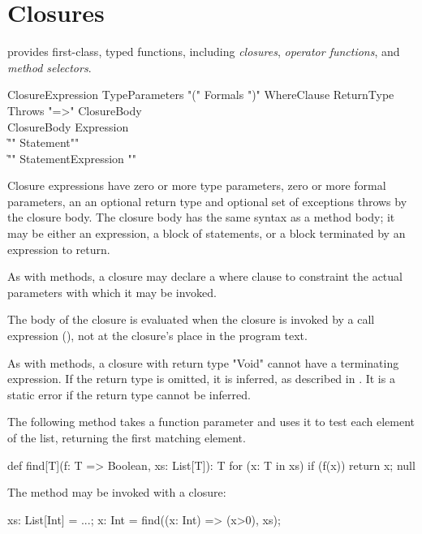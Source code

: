 \section{Closures}
\label{Closures}

\Xten{} provides first-class, typed functions, including
\emph{closures},
\emph{operator functions},
and \emph{method selectors}.

\begin{grammar}
ClosureExpression \:
        TypeParameters\opt
        \xcd"("
        Formals\opt
        \xcd")"
        WhereClause\opt
        ReturnType\opt
        Throws\opt
        \xcd"=>" ClosureBody \\
ClosureBody \:
        Expression \\
        \| \xcd"{" Statement\star \xcd"}" \\
        \| \xcd"{" Statement\star Expression \xcd"}" \\
\end{grammar}

Closure expressions have zero or more type parameters,
zero or more formal parameters, an an optional return type and
optional set of exceptions throws by the closure body.  The
closure body has the same syntax as a method body; it may be
either an expression, a block of statements, or a block
terminated by an expression to return.

\label{ClosureWhereClause}

As with methods, a closure may declare a where clause to
constraint the actual parameters with which it may be invoked.

The body of the closure is evaluated when the closure is
invoked by a call expression (), not at the closure's
place in the program text.

As with methods, a closure with return type \xcd"Void" cannot
have a terminating expression. 
If the return type is omitted, it is inferred, as described in
.
It is a static error if the return type cannot be inferred.

\begin{example}
The following method takes a function parameter and uses it to
test each element of the list, returning the first matching
element.
\begin{xten}
def find[T](f: T => Boolean, xs: List[T]): T {
  for (x: T in xs)
    if (f(x)) return x;
  null
}
\end{xten}

The method may be invoked with a closure:
\begin{xten}
xs: List[Int] = ...;
x: Int = find((x: Int) => (x>0), xs);
\end{xten}
\end{example}

